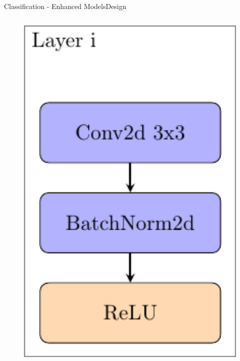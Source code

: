 \documentclass{beamer}
\begin{document}
\begin{frame}{Classification - Enhanced Models}{Design}
\begin{columns}
\begin{column}{0.2\textwidth}
\begin{figure}[p]
{		\includegraphics[width=1.0\textwidth]{modellayer.pdf}		
	}
	\end{figure}
		

\end{column}
\end{columns}
\end{frame}
\end{document}

